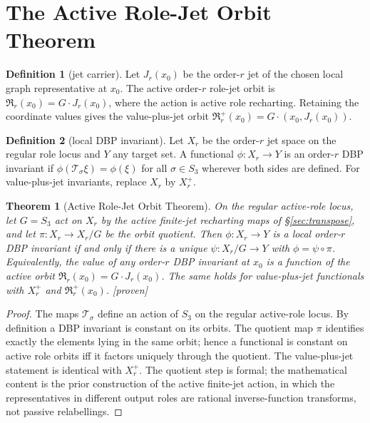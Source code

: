 \documentclass[11pt]{article}
\newcommand{\Proven}{\textsf{[proven]}}
\theoremstyle{plain}
\newtheorem{theorem}{Theorem}
\theoremstyle{definition}
\newtheorem{definition}{Definition}
\begin{document}
\section{The Active Role-Jet Orbit Theorem}
\label{sec:orbit}

\begin{definition}[jet carrier]
Let $J_r(x_0)$ be the order-$r$ jet of the chosen local graph representative at $x_0$. The active
order-$r$ role-jet orbit is $\mathfrak R_r(x_0)=G\cdot J_r(x_0)$, where the action is active role
recharting. Retaining the coordinate values gives the value-plus-jet orbit
$\mathfrak R_r^{+}(x_0)=G\cdot(x_0,J_r(x_0))$.
\end{definition}

\begin{definition}[local DBP invariant]
Let $X_r$ be the order-$r$ jet space on the regular role locus and $Y$ any target set. A functional
$\phi:X_r\to Y$ is an order-$r$ DBP invariant if $\phi(\mathcal T_\sigma\xi)=\phi(\xi)$ for all
$\sigma\in S_3$ wherever both sides are defined. For value-plus-jet invariants, replace $X_r$ by
$X_r^{+}$.
\end{definition}

\begin{theorem}[Active Role-Jet Orbit Theorem]
\label{thm:orbit}
On the regular active-role locus, let $G=S_3$ act on $X_r$ by the active finite-jet recharting maps
of \S\ref{sec:transpose}, and let $\pi:X_r\to X_r/G$ be the orbit quotient. Then $\phi:X_r\to Y$ is a
local order-$r$ DBP invariant if and only if there is a unique $\psi:X_r/G\to Y$ with
$\phi=\psi\circ\pi$. Equivalently, the value of any order-$r$ DBP invariant at $x_0$ is a function of
the active orbit $\mathfrak R_r(x_0)=G\cdot J_r(x_0)$. The same holds for value-plus-jet functionals
with $X_r^{+}$ and $\mathfrak R_r^{+}(x_0)$. \Proven
\end{theorem}

\begin{proof}
The maps $\mathcal T_\sigma$ define an action of $S_3$ on the regular active-role locus. By
definition a DBP invariant is constant on its orbits. The quotient map $\pi$ identifies exactly the
elements lying in the same orbit; hence a functional is constant on active role orbits iff it factors
uniquely through the quotient. The value-plus-jet statement is identical with $X_r^{+}$. The quotient
step is formal; the mathematical content is the prior construction of the active finite-jet action,
in which the representatives in different output roles are rational inverse-function transforms, not
passive relabellings.
\end{proof}
\end{document}
